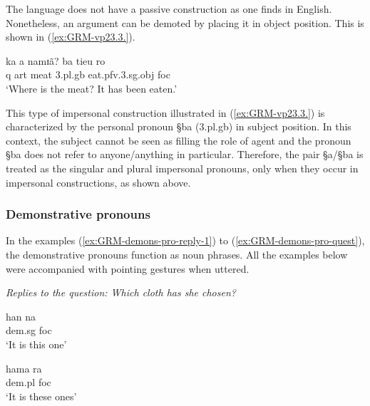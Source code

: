 The language does not have a passive construction as one finds in English.
Nonetheless,  an argument  can be demoted  by placing it in object position.
This is shown in (\ref{ex:GRM-vp23.3.}).

\begin{exe}
\ex\label{ex:GRM-vp23.3.}
\gll ka a namɪã?  ba tieu ro\\
      {\sc q} {\sc art} meat {\sc 3.pl.g}b  eat.{\sc pfv}.{\sc 3.sg.obj} {\sc
foc}\\
\glt  `Where is the meat? It has been eaten.'
\end{exe}


This type of impersonal
construction illustrated in  (\ref{ex:GRM-vp23.3.})  is characterized by the
personal pronoun {\S ba} ({\sc 3.pl.g}b)  in
subject position. In this context,  the subject cannot be seen as filling the
role of agent and the pronoun {\S ba} does not refer to anyone/anything in 
particular. Therefore,  the pair {\S a}/{\S ba} is treated  as the singular and
plural impersonal pronouns, only when they occur in impersonal constructions, 
as shown above.






\subsubsection{Demonstrative pronouns}
\label{sec:GRM-demons-pro}


In the examples (\ref{ex:GRM-demons-pro-reply-1}) to
(\ref{ex:GRM-demons-pro-quest}),  the demonstrative pronouns  
function as noun phrases. All the examples below were accompanied with
 pointing gestures when uttered.



\begin{exe}
\ex\label{ex:GRM-demons-pro-reply-1}{\it Replies to the question: Which cloth
has she chosen?}
 \begin{xlist}
 
  \ex\label{ex:GRM-demons-pro-reply-1sg} 
 \gll han na\\
   {\sc dem.sg} {\sc foc}\\
 \glt `It is this one' 
   
      \ex\label{ex:GRM-demons-pro-reply-1pl}
       \gll hama ra\\
   {\sc dem.pl} {\sc foc}\\
 \glt `It is these ones' 
 \end{xlist}
\end{exe}



